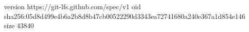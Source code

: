 version https://git-lfs.github.com/spec/v1
oid sha256:05d8d499e4b6a2b8d8b47cb00522290d3343ea72741680a240e367a1d854e146
size 43840
